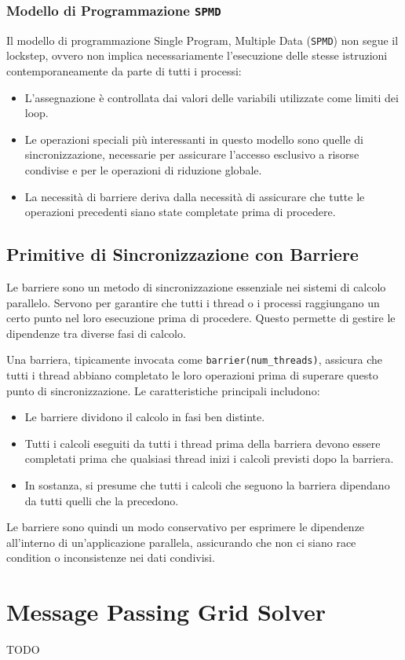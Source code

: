 \subsubsection{Modello di Programmazione \texttt{SPMD}}
Il modello di programmazione Single Program, Multiple Data (\texttt{SPMD}) non segue il lockstep, ovvero non implica necessariamente l'esecuzione delle stesse istruzioni contemporaneamente da parte di tutti i processi:
\begin{itemize}
    \item L'assegnazione è controllata dai valori delle variabili utilizzate come limiti dei loop.
    \item Le operazioni speciali più interessanti in questo modello sono quelle di sincronizzazione, necessarie per assicurare l'accesso esclusivo a risorse condivise e per le operazioni di riduzione globale.
    \item La necessità di barriere deriva dalla necessità di assicurare che tutte le operazioni precedenti siano state completate prima di procedere.
\end{itemize}

\subsection{Primitive di Sincronizzazione con Barriere}

Le barriere sono un metodo di sincronizzazione essenziale nei sistemi di
calcolo parallelo. Servono per garantire che tutti i thread o i processi
raggiungano un certo punto nel loro esecuzione prima di procedere. Questo
permette di gestire le dipendenze tra diverse fasi di calcolo.

Una barriera, tipicamente invocata come \texttt{barrier(num\_threads)},
assicura che tutti i thread abbiano completato le loro operazioni prima
di superare questo punto di sincronizzazione. Le caratteristiche principali
includono:

\begin{itemize}
    \item Le barriere dividono il calcolo in fasi ben distinte.
    \item Tutti i calcoli eseguiti da tutti i thread prima della barriera
    devono essere completati prima che qualsiasi thread inizi i calcoli
    previsti dopo la barriera.
    \item In sostanza, si presume che tutti i calcoli che seguono la
    barriera dipendano da tutti quelli che la precedono.
\end{itemize}

Le barriere sono quindi un modo conservativo per esprimere le dipendenze
all'interno di un'applicazione parallela, assicurando che non ci siano
race condition o inconsistenze nei dati condivisi.

\section{Message Passing Grid Solver}

TODO
